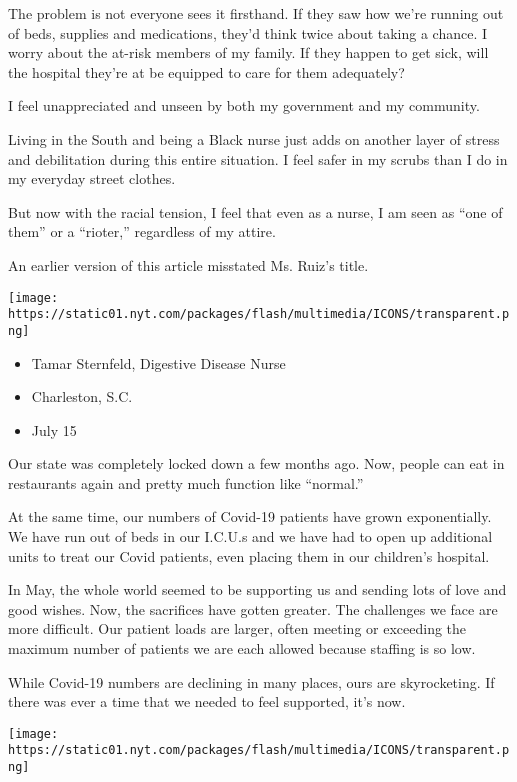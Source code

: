 The problem is not everyone sees it firsthand. If they saw how we're
running out of beds, supplies and medications, they'd think twice about
taking a chance. I worry about the at-risk members of my family. If they
happen to get sick, will the hospital they're at be equipped to care for
them adequately?

I feel unappreciated and unseen by both my government and my community.

Living in the South and being a Black nurse just adds on another layer
of stress and debilitation during this entire situation. I feel safer in
my scrubs than I do in my everyday street clothes.

But now with the racial tension, I feel that even as a nurse, I am seen
as ``one of them'' or a ``rioter,'' regardless of my attire.

An earlier version of this article misstated Ms. Ruiz's title.

\texttt{[image: https://static01.nyt.com/packages/flash/multimedia/ICONS/transparent.png]}

\begin{itemize}
\tightlist
\item
  Tamar Sternfeld, Digestive Disease Nurse
\item
  Charleston, S.C.
\item
  July 15
\end{itemize}

Our state was completely locked down a few months ago. Now, people can
eat in restaurants again and pretty much function like ``normal.''

At the same time, our numbers of Covid-19 patients have grown
exponentially. We have run out of beds in our I.C.U.s and we have had to
open up additional units to treat our Covid patients, even placing them
in our children's hospital.

In May, the whole world seemed to be supporting us and sending lots of
love and good wishes. Now, the sacrifices have gotten greater. The
challenges we face are more difficult. Our patient loads are larger,
often meeting or exceeding the maximum number of patients we are each
allowed because staffing is so low.

While Covid-19 numbers are declining in many places, ours are
skyrocketing. If there was ever a time that we needed to feel supported,
it's now.

\texttt{[image: https://static01.nyt.com/packages/flash/multimedia/ICONS/transparent.png]}

